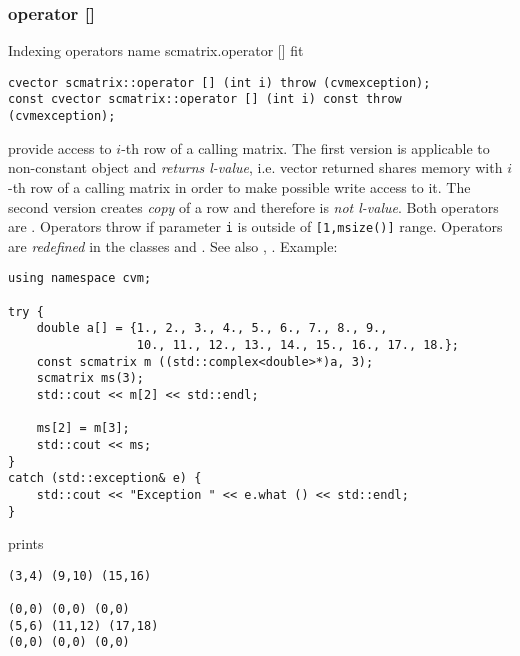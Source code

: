 \subsubsection{operator []}
Indexing operators%
\pdfdest name {scmatrix.operator []} fit
\begin{verbatim}
cvector scmatrix::operator [] (int i) throw (cvmexception);
const cvector scmatrix::operator [] (int i) const throw (cvmexception);
\end{verbatim}
provide access to \hbox{$i$-th} row of a calling matrix. The first version
is applicable to  non-constant object and
\emph{returns  l-value}, i.e.  vector returned shares  memory
with  \hbox{$i$-th} row of a calling matrix
in order to make possible write access to it.
The second version creates  \emph{copy} of a row and therefore is
\emph{not  l-value}.
Both operators are \Based.
Operators throw 
if  parameter \verb"i" is outside of \verb"[1,msize()]" range.
Operators are \emph{redefined}
in  the classes 
and .
See also ,
.
Example:
\begin{Verbatim}
using namespace cvm;

try {
    double a[] = {1., 2., 3., 4., 5., 6., 7., 8., 9.,
                  10., 11., 12., 13., 14., 15., 16., 17., 18.};
    const scmatrix m ((std::complex<double>*)a, 3);
    scmatrix ms(3);
    std::cout << m[2] << std::endl;

    ms[2] = m[3];
    std::cout << ms;
}
catch (std::exception& e) {
    std::cout << "Exception " << e.what () << std::endl;
}
\end{Verbatim}
prints
\begin{Verbatim}
(3,4) (9,10) (15,16)

(0,0) (0,0) (0,0)
(5,6) (11,12) (17,18)
(0,0) (0,0) (0,0)
\end{Verbatim}
\newpage



